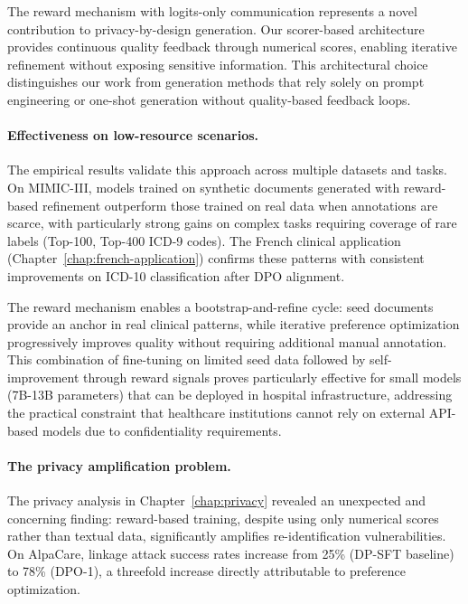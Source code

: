 The reward mechanism with logits-only communication represents a novel contribution to privacy-by-design generation.
Our scorer-based architecture provides continuous quality feedback through numerical scores, enabling iterative refinement without exposing sensitive information.
This architectural choice distinguishes our work from generation methods that rely solely on prompt engineering or one-shot generation without quality-based feedback loops.

\paragraph{Effectiveness on low-resource scenarios.}

The empirical results validate this approach across multiple datasets and tasks.
On MIMIC-III, models trained on synthetic documents generated with reward-based refinement outperform those trained on real data when annotations are scarce, with particularly strong gains on complex tasks requiring coverage of rare labels (Top-100, Top-400 ICD-9 codes).
The French clinical application (Chapter~\ref{chap:french-application}) confirms these patterns with consistent improvements on ICD-10 classification after DPO alignment.

The reward mechanism enables a bootstrap-and-refine cycle: seed documents provide an anchor in real clinical patterns, while iterative preference optimization progressively improves quality without requiring additional manual annotation.
This combination of fine-tuning on limited seed data followed by self-improvement through reward signals proves particularly effective for small models (7B-13B parameters) that can be deployed in hospital infrastructure, addressing the practical constraint that healthcare institutions cannot rely on external API-based models due to confidentiality requirements.

\paragraph{The privacy amplification problem.}

The privacy analysis in Chapter~\ref{chap:privacy} revealed an unexpected and concerning finding: reward-based training, despite using only numerical scores rather than textual data, significantly amplifies re-identification vulnerabilities.
On AlpaCare, linkage attack success rates increase from 25\% (DP-SFT baseline) to 78\% (DPO-1), a threefold increase directly attributable to preference optimization.

